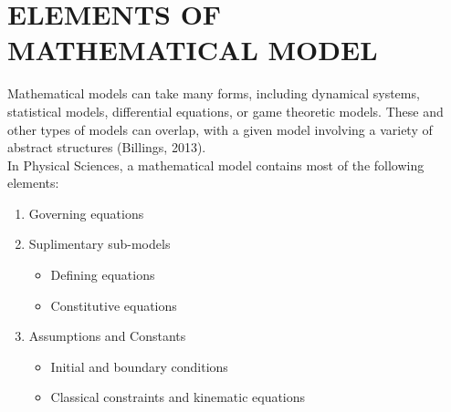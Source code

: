 \documentclass[12pt]{report}
\newcommand{\NI}{\noindent}
\begin{document}
	\section{ELEMENTS OF MATHEMATICAL MODEL}
	Mathematical models can take many forms, including dynamical systems, statistical models, differential equations, or game theoretic models. These and other types of models can overlap, with a given model involving a variety of abstract structures (Billings, 2013).\\
	
	\NI In Physical Sciences, a mathematical model contains most of the following elements:
	\begin{enumerate}
		\item Governing equations
		\item Suplimentary sub-models
			\begin{itemize}
				\item Defining equations
				\item Constitutive equations
			\end{itemize}
		\item Assumptions and Constants
			\begin{itemize}
				\item Initial and boundary conditions
				\item Classical constraints and kinematic equations
			\end{itemize}
	\end{enumerate}
	\newpage
\end{document}
